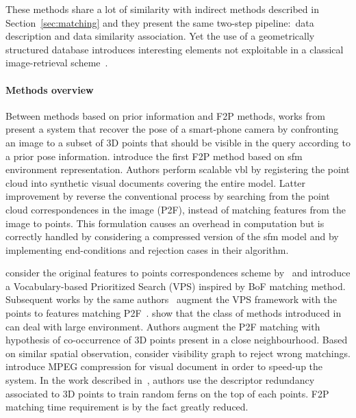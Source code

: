 These methods share a lot of similarity with indirect methods described in Section~\ref{sec:matching} and they present the same two-step pipeline:~data description and data similarity association. Yet the use of a geometrically structured database introduces interesting elements not exploitable in a classical image-retrieval scheme~\citep{Sattler2012a}.

\paragraph{Methods overview}
Between methods based on prior information and F2P methods, works from \citet{Arth2009} present a system that recover the pose of a smart-phone camera by confronting an image to a subset of 3D points that should be visible in the query according to a prior pose information. \citet{Irschara2009} introduce the first F2P method based on \ac{sfm} environment representation. Authors perform scalable \ac{vbl} by registering the point cloud into synthetic visual documents covering the entire model. Latter improvement by \citet{Li2010} reverse the conventional process by searching from the point cloud correspondences in the image (P2F), instead of matching features from the image to points. This formulation causes an overhead in computation but is correctly handled by considering a compressed version of the \ac{sfm} model and by implementing end-conditions and rejection cases in their algorithm.

\citet{Sattler2011} consider the original features to points correspondences scheme by~\citep{Irschara2009} and introduce a Vocabulary-based Prioritized Search (VPS) inspired by BoF matching method. Subsequent works by the same authors~\citep{Sattler2012} augment the VPS framework with the points to features matching P2F~\citep{Li2010}. \citet{Li2012} show that the class of methods introduced in~\citep{Irschara2009,Li2010} can deal with large environment. Authors augment the P2F matching with hypothesis of co-occurrence of 3D points present in a close neighbourhood. Based on similar spatial observation, \citet{Sattler2015} consider visibility graph to reject wrong matchings. \citet{Heisterklaus2014} introduce MPEG compression for visual document in order to speed-up the system. In the work described in~\citep{Donoser2014}, authors use the descriptor redundancy associated to 3D points to train random ferns on the top of each points. F2P matching time requirement is by the fact greatly reduced. 

